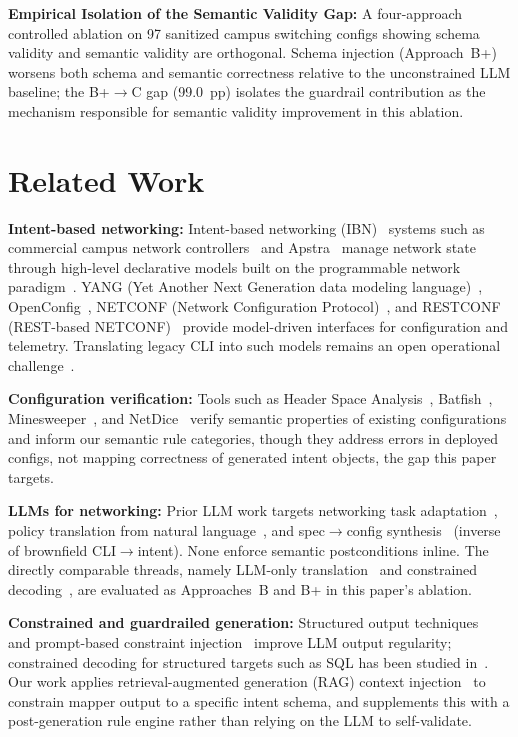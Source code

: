 \documentclass[conference]{IEEEtran}
\begin{document}
\textbf{Empirical Isolation of the Semantic Validity Gap:} A four-approach controlled ablation on 97 sanitized campus switching configs showing schema validity and semantic validity are orthogonal. Schema injection (Approach~B+) worsens both schema and semantic correctness relative to the unconstrained LLM baseline; the B+$\to$C gap (99.0~pp) isolates the guardrail contribution as the mechanism responsible for semantic validity improvement in this ablation.


\section{Related Work}

\textbf{Intent-based networking:} Intent-based networking (IBN)~\cite{clemm2022ibn} systems such as commercial campus network controllers~\cite{leivadeas2023survey} and Apstra~\cite{juniper2023apstra} manage network state through high-level declarative models built on the programmable network paradigm~\cite{kreutz2015sdn}. YANG (Yet Another Next Generation data modeling language)~\cite{bjorklund2010yang}, OpenConfig~\cite{openconfig2016}, NETCONF (Network Configuration Protocol)~\cite{enns2011netconf}, and RESTCONF (REST-based NETCONF)~\cite{bierman2017restconf} provide model-driven interfaces for configuration and telemetry. Translating legacy CLI into such models remains an open operational challenge~\cite{leivadeas2023survey}.

\textbf{Configuration verification:} Tools such as Header Space Analysis~\cite{kazemian2012hsa}, Batfish~\cite{fogel2015batfish}, Minesweeper~\cite{beckett2017minesweeper}, and NetDice~\cite{steffen2020netdice} verify semantic properties of existing configurations and inform our semantic rule categories, though they address errors in deployed configs, not mapping correctness of generated intent objects, the gap this paper targets.

\textbf{LLMs for networking:} Prior LLM work targets networking task adaptation~\cite{wu2024netllm}, policy translation from natural language~\cite{dzeparoska2023policy}, and spec$\to$config synthesis~\cite{mondal2023router} (inverse of brownfield CLI$\to$intent). None enforce semantic postconditions inline. The directly comparable threads, namely LLM-only translation~\cite{mondal2023router} and constrained decoding~\cite{scholak2021picard}, are evaluated as Approaches~B and B+ in this paper's ablation.

\textbf{Constrained and guardrailed generation:} Structured output techniques~\cite{willard2023guided} and prompt-based constraint injection~\cite{beurerkellner2023prompting} improve LLM output regularity; constrained decoding for structured targets such as SQL has been studied in~\cite{scholak2021picard}. Our work applies retrieval-augmented generation (RAG) context injection~\cite{lewis2020rag,gao2023rag} to constrain mapper output to a specific intent schema, and supplements this with a post-generation rule engine rather than relying on the LLM to self-validate.
\end{document}
